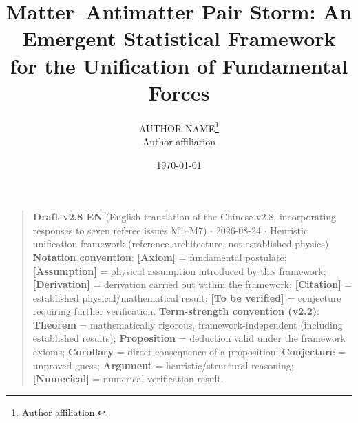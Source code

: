 \documentclass[12pt]{article}
\title{Matter--Antimatter Pair Storm: An Emergent Statistical Framework for the Unification of Fundamental Forces}
\author{AUTHOR NAME\thanks{Author affiliation.} \\ \small Author affiliation}
\date{\today}
\newcommand{\mtag}[1]{\textbf{[#1]}}
\begin{document}
\maketitle


\begin{quote}
\textbf{Draft v2.8 EN} (English translation of the Chinese v2.8, incorporating responses to seven referee issues M1--M7) \ensuremath{\cdot} 2026-08-24 \ensuremath{\cdot} Heuristic unification framework (reference architecture, not established physics)
\textbf{Notation convention}: \mtag{Axiom} = fundamental postulate; \mtag{Assumption} = physical assumption introduced by this framework; \mtag{Derivation} = derivation carried out within the framework; \mtag{Citation} = established physical/mathematical result; \mtag{To be verified} = conjecture requiring further verification. \textbf{Term-strength convention (v2.2)}: \textbf{Theorem} = mathematically rigorous, framework-independent (including established results); \textbf{Proposition} = deduction valid under the framework axioms; \textbf{Corollary} = direct consequence of a proposition; \textbf{Conjecture} = unproved guess; \textbf{Argument} = heuristic/structural reasoning; \mtag{Numerical} = numerical verification result.
\end{quote}
\end{document}
